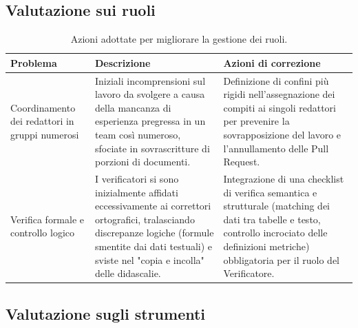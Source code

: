 \documentclass[a4paper, 10pt, colorlinks=true, linkcolor=black, urlcolor=blue, citecolor=blue, hidelinks]{article}
\begin{document}
\subsection{Valutazione sui ruoli}

\begin{table}[H]
    \centering
    \renewcommand{\arraystretch}{1.5}
    \begin{tabularx}{\textwidth}{|>{\raggedright\arraybackslash}p{3.5cm}|>{\raggedright\arraybackslash}X|>{\raggedright\arraybackslash}X|}
        \hline
        \textbf{Problema} & \textbf{Descrizione} & \textbf{Azioni di correzione} \\ \hline
        
        Coordinamento dei redattori in gruppi numerosi & Iniziali incomprensioni sul lavoro da svolgere a causa della mancanza di esperienza pregressa in un team così numeroso, sfociate in sovrascritture di porzioni di documenti. & Definizione di confini più rigidi nell'assegnazione dei compiti ai singoli redattori per prevenire la sovrapposizione del lavoro e l'annullamento delle Pull Request. \\ \hline
        
        Verifica formale e controllo logico & I verificatori si sono inizialmente affidati eccessivamente ai correttori ortografici, tralasciando discrepanze logiche (formule smentite dai dati testuali) e sviste nel "copia e incolla" delle didascalie. & Integrazione di una checklist di verifica semantica e strutturale (matching dei dati tra tabelle e testo, controllo incrociato delle definizioni metriche) obbligatoria per il ruolo del Verificatore. \\ \hline
    \end{tabularx}
    \caption{Azioni adottate per migliorare la gestione dei ruoli.}
    \label{tab:azioni-ruoli}
\end{table}

\subsection{Valutazione sugli strumenti}
\end{document}
